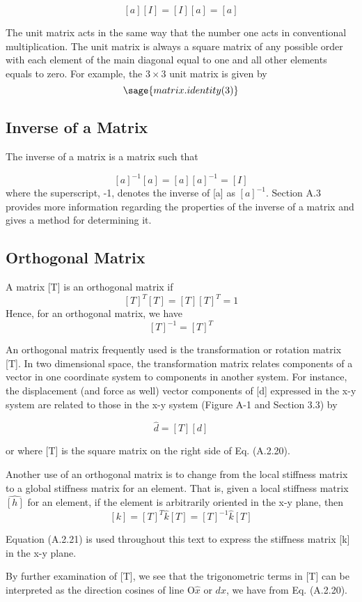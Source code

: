 \documentclass[12pt]{report}
\begin{document}
$$[a][I]=[I][a]=[a]$$

The unit matrix acts in the same way that the number one acts in
conventional multiplication. The unit matrix is always a square matrix
of any possible order with each element of the main diagonal equal to
one and all other elements equals to zero. For example, the $3 \times 3$
unit matrix is given by
$$\sage{matrix.identity(3)}$$

\subsection{Inverse of a Matrix}

The inverse of a matrix is a matrix such that

$$[a]^{-1}[a]=[a][a]^{-1}=[I]$$
where the superscript, -1, denotes the inverse of [a] as $[a]^{-1}$.
Section A.3 provides more information regarding the properties of the
inverse of a matrix and gives a method for determining it.

\subsection{Orthogonal Matrix}
A matrix [T] is an orthogonal matrix if
$$[T]^T[T] = [T][T]^T=1$$
Hence, for an orthogonal matrix, we have
$$[T]^{-1}=[T]^T$$

An orthogonal matrix frequently used is the transformation or rotation
matrix [T]. In two dimensional space, the transformation matrix
relates components of a vector in one coordinate system to components
in another system. For instance, the displacement (and force as well)
vector components of [d] expressed in the x-y system are related to
those in the x-y system (Figure A-1 and Section 3.3) by

$$\hat{d}=[T][d]$$


or
where [T] is the square matrix on the right side of Eq. (A.2.20).


Another use of an orthogonal matrix is to change from the local
stiffness matrix to a global stiffness matrix for an element. That is,
given a local stiffness matrix $\hat{[h]}$ for an element, if the
element is arbitrarily oriented in the x-y plane, then
$$[k]=[T]^T \hat{k}[T]=[T]^{-1}\hat{k}[T]$$

Equation (A.2.21) is used throughout this text to express the
stiffness matrix [k] in the x-y plane.

By further examination of [T], we see that the trigonometric terms in
[T] can be interpreted as the direction cosines of line O$\hat{x}$ or
$d{x}$, we have from Eq. (A.2.20).
\end{document}
